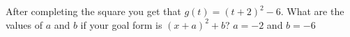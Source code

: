 {After completing the square you get that $g(t)=(t+2)^2-6$. What are the values of $a$ and $b$ if your goal form is $(x+a)^2+b$?}
{$a=-2$ and $b=-6$}
